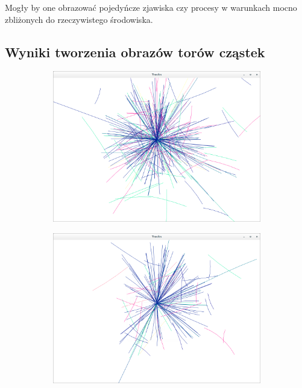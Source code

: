 Mogły by one obrazować pojedyńcze zjawiska czy procesy w warunkach mocno zbliżonych do rzeczywistego środowiska.
\newpage
\begin{appendices}
\section{Wyniki tworzenia obrazów torów cząstek}
\label{Tory}
\begin{figure}[H]
	\begin{subfigure}{0.50\textwidth}
		\centering
 		\includegraphics[width=\textwidth]{trackScreen1.png}
    	\caption{}
 		\label{rys18}
	\end{subfigure}
	\hfill
	\begin{subfigure}{0.50\textwidth}
		\centering
		\includegraphics[width=\textwidth]{trackScreen3.png}
    	\caption{}
		\label{rys19}
	\end{subfigure}
	

\end{figure}
\end{appendices}
